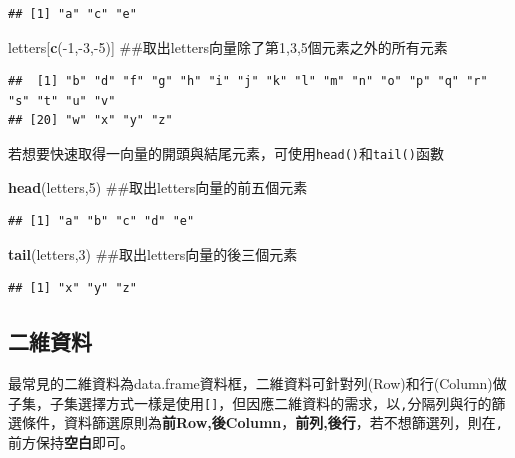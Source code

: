 \documentclass[]{book}
\newenvironment{Shaded}{\begin{snugshade}}{\end{snugshade}}
\newcommand{\KeywordTok}[1]{\textcolor[rgb]{0.13,0.29,0.53}{\textbf{{#1}}}}
\newcommand{\DecValTok}[1]{\textcolor[rgb]{0.00,0.00,0.81}{{#1}}}
\newcommand{\NormalTok}[1]{{#1}}
\theoremstyle{definition}
\theoremstyle{definition}
\theoremstyle{remark}
\begin{document}
\begin{verbatim}
## [1] "a" "c" "e"
\end{verbatim}

\begin{Shaded}
\begin{Highlighting}[]
\NormalTok{letters[}\KeywordTok{c}\NormalTok{(-}\DecValTok{1}\NormalTok{,-}\DecValTok{3}\NormalTok{,-}\DecValTok{5}\NormalTok{)] ##取出letters向量除了第1,3,5個元素之外的所有元素}
\end{Highlighting}
\end{Shaded}

\begin{verbatim}
##  [1] "b" "d" "f" "g" "h" "i" "j" "k" "l" "m" "n" "o" "p" "q" "r" "s" "t" "u" "v"
## [20] "w" "x" "y" "z"
\end{verbatim}

若想要快速取得一向量的開頭與結尾元素，可使用\texttt{head()}和\texttt{tail()}函數

\begin{Shaded}
\begin{Highlighting}[]
\KeywordTok{head}\NormalTok{(letters,}\DecValTok{5}\NormalTok{) ##取出letters向量的前五個元素}
\end{Highlighting}
\end{Shaded}

\begin{verbatim}
## [1] "a" "b" "c" "d" "e"
\end{verbatim}

\begin{Shaded}
\begin{Highlighting}[]
\KeywordTok{tail}\NormalTok{(letters,}\DecValTok{3}\NormalTok{) ##取出letters向量的後三個元素}
\end{Highlighting}
\end{Shaded}

\begin{verbatim}
## [1] "x" "y" "z"
\end{verbatim}

\subsection{二維資料}

最常見的二維資料為data.frame資料框，二維資料可針對列(Row)和行(Column)做子集，子集選擇方式一樣是使用\texttt{{[}{]}}，但因應二維資料的需求，以\texttt{,}分隔列與行的篩選條件，資料篩選原則為\textbf{前Row,後Column}，\textbf{前列,後行}，若不想篩選列，則在\texttt{,}前方保持\textbf{空白}即可。
\end{document}
